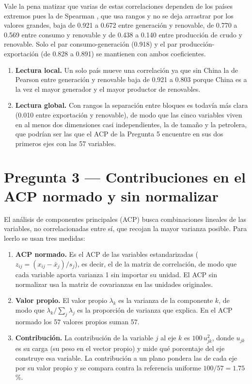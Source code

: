 \documentclass[oneside, openany, fontset=libertinus]{mitthesis}
\providecommand{\tightlist}{\setlength{\itemsep}{0pt}\setlength{\parskip}{0pt}}
\begin{document}
Vale la pena matizar que varias de estas correlaciones dependen de los
países extremos pues la de Spearman \parencite{spearman1904}, que usa
rangos y no se deja arrastrar por los valores grandes, baja de 0.921 a
0.672 entre generación y renovable, de 0.770 a 0.569 entre consumo y
renovable y de 0.438 a 0.140 entre producción de crudo y renovable. Solo
el par consumo-generación (0.918) y el par producción-exportación (de
0.828 a 0.891) se mantienen con ambos coeficientes.

\begin{enumerate}
\def\labelenumi{\alph{enumi}.}
\tightlist
\item
  \textbf{Lectura local.} Un solo país mueve una correlación ya que sin
  China la de Pearson entre generación y renovable baja de 0.921 a 0.803
  porque China es a la vez el mayor generador y el mayor productor de
  renovables.
\item
  \textbf{Lectura global.} Con rangos la separación entre bloques es
  todavía más clara (0.010 entre exportación y renovable), de modo que
  las cinco variables viven en al menos dos dimensiones casi
  independientes, la de tamaño y la petrolera, que podrían ser las que
  el ACP de la Pregunta 5 encuentre en sus dos primeros ejes con las 57
  variables.
\end{enumerate}

\section{Pregunta 3 --- Contribuciones en el ACP normado y sin
normalizar}\label{p3}

El análisis de componentes principales (ACP) \parencite{pearson1901,
hotelling1933} busca combinaciones lineales de las variables, no
correlacionadas entre sí, que recojan la mayor varianza posible. Para
leerlo se usan tres medidas:

\begin{enumerate}
\def\labelenumi{\alph{enumi}.}
\tightlist
\item
  \textbf{ACP normado.} Es el ACP de las variables estandarizadas
  (\(z_{ij} = (x_{ij} - \bar{x}_j)/s_j\)), es decir, el de la matriz de
  correlación, de modo que cada variable aporta varianza 1 sin importar
  su unidad. El ACP sin normalizar usa la matriz de covarianzas en las
  unidades originales.
\item
  \textbf{Valor propio.} El valor propio \(\lambda_k\) es la varianza de
  la componente \(k\), de modo que \(\lambda_k / \sum_j \lambda_j\) es
  la proporción de varianza que explica. En el ACP normado los 57
  valores propios suman 57.
\item
  \textbf{Contribución.} La contribución de la variable \(j\) al eje
  \(k\) es \(100\,u_{jk}^2\), donde \(u_{jk}\) es su carga (su peso en
  el vector propio) y mide qué porcentaje del eje construye esa
  variable. La contribución a un plano pondera las de cada eje por su
  valor propio y se compara contra la referencia uniforme
  \(100/57 = 1.75\) \%.
\end{enumerate}
\end{document}
